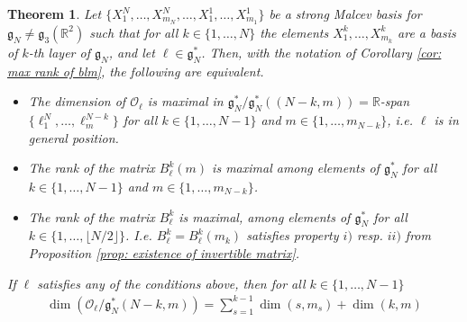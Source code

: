\documentclass[pdflatex,sn-mathphys-num]{sn-jnl}
\theoremstyle{thmstyletwo}
\theoremstyle{thmstyleone}
\newtheorem{theorem}[definition]{Theorem}
\theoremstyle{thmstyletwo}
\newcommand{\fancyg}{\mathfrak{g}}
\newcommand{\R}{\mathbb{R}}
\begin{document}
	\begin{theorem}\label{thm: characterization of gen orbits}
		Let $\{X_1^N, \ldots, X_{m_N}^N, \ldots,X_1^1, \ldots, X_{m_1}^1\}$ be a strong Malcev basis for $\fancyg_N \neq \fancyg_3(\R^2)$ such that for all $k \in \{1, \ldots, N\}$ the elements $X_1^k, \ldots, X_{m_k}^k$ are a basis of $k$-th layer of $\fancyg_N$, and let $\ell\in \fancyg_{N}^*$. Then, with the notation of Corollary \ref{cor: max rank of blm}, the following are equivalent.
		\begin{itemize}
			\item[i)] The dimension of $\mathcal{O}_{\ell}$ is maximal in $\fancyg_{N}^*/\fancyg_{N}^*((N-k, m)) = \mathbb{R}$-span$\{\ell_1^N, \ldots, \ell_{m}^{N-k}\}$ for all $k \in \{1, \ldots,N-1\}$ and $m \in \{1, \ldots, m_{N-k}\}$, i.e. $\ell$ is in general position.
			\item[ii)] The rank of the matrix $B_{\ell}^{k}(m)$ is maximal among elements of $\fancyg_{N}^*$ for all $k \in \{1, \ldots,N-1\}$ and $m \in \{1, \ldots, m_{N-k}\}$.
			\item[iii)] The rank of the matrix $B_{\ell}^{k}$ is maximal,  among elements of $\fancyg_{N}^*$ for all $k \in \{1, \ldots,\lfloor N/2\rfloor\}$. I.e. $B_{\ell}^{k} = B_{\ell}^{k}(m_k)$ satisfies property $i)$ resp. $ii)$ from Proposition \ref{prop: existence of invertible matrix}.
		\end{itemize}
		If $\ell$ satisfies any of the conditions above, then for all $k \in \{1, \ldots,N-1\}$
		\begin{align}\label{eq: dimension formual for generic orbits}
			\operatorname{dim}\left(\mathcal{O}_{\ell} / \fancyg_N^*(N - k, m)\right) =
			\sum_{s=1}^{k-1}\operatorname{dim}(s,m_s)+ \operatorname{dim}(k,m)
		\end{align}
	\end{theorem}
\end{document}
